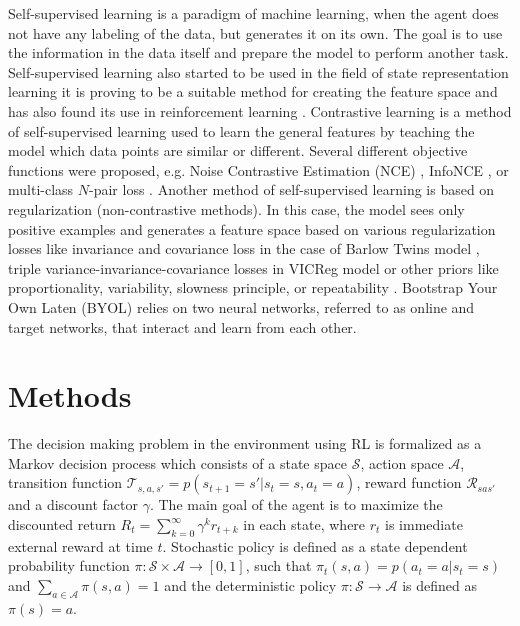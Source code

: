 \documentclass[a4paper,11pt]{elsarticle}
\begin{document}
Self-supervised learning is a paradigm of machine learning, when the agent does not have any labeling of the data, but generates it on its own. The goal is to use the information in the data itself and prepare the model to perform another task. Self-supervised learning also started to be used in the field of state representation learning \citep{Timoth2018} it is proving to be a suitable method for creating the feature space \citep{Anand2019} and has also found its use in reinforcement learning \citep{Srinivas2020, guo2022byol}. Contrastive learning \citep{Chopra2005} is a method of self-supervised learning used to learn the general features by teaching the model which data points are similar or different. Several different objective functions were proposed, e.g. Noise Contrastive Estimation (NCE) \citep{Gutmann2010}, InfoNCE \citep{Oord2018}, or multi-class $N$-pair loss \citep{Sohn2016}. Another method of self-supervised learning is based on regularization (non-contrastive methods). In this case, the model sees only positive examples and generates a feature space based on various regularization losses like invariance and covariance loss in the case of Barlow Twins model \citep{Zbontar2021}, triple variance-invariance-covariance losses in VICReg model \citep{Bardes2022} or other priors like proportionality, variability, slowness principle, or repeatability \citep{jonschkowski2015learning}. 
Bootstrap Your Own Laten (BYOL) \citep{grill2020bootstrap} relies on two neural networks, referred to as online and target networks, that interact and learn from each other.

\section{Methods}
\label{sec:methods}

The decision making problem in the environment using RL is formalized as a Markov decision process which consists of a state space $\mathcal{S}$, action space $\mathcal{A}$, transition function $\mathcal{T}_{s,a,s'} = p(s_{t+1} = s'|s_t = s, a_{t} = a)$, reward function $\mathcal{R}_{sas'}$ and a discount factor $\gamma$. The main goal of the agent is to maximize the discounted return  
$R_t = \sum_{k=0}^\infty \gamma^k r_{t+k}$
in each state, where $r_t$ is immediate external reward at time $t$.
Stochastic policy is defined as a state dependent probability function $\pi : \mathcal{S} \times \mathcal{A} \rightarrow [0, 1]$, such that
$\pi_{t}(s,a) = p(a_t = a | s_t = s)$ and $\sum_{a \in \mathcal{A}} \pi(s,a) = 1$
and the deterministic policy $\pi: \mathcal{S}\rightarrow \mathcal{A}$ is defined as $\pi(s) = a$.
\end{document}
